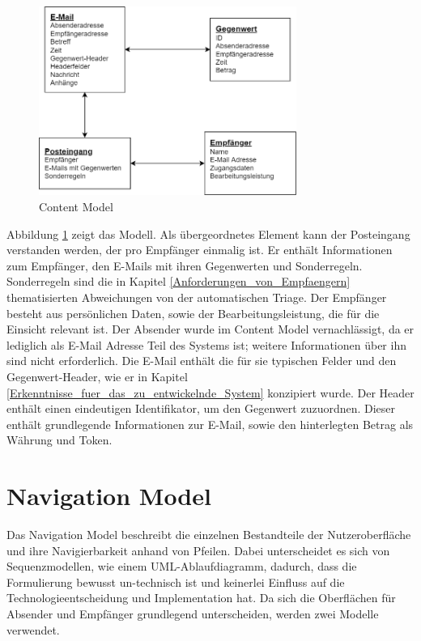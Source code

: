 \begin{figure}[!ht]
	\centering
		\includegraphics[width=0.75\textwidth]{Figures/Content Model.png}
	\caption{Content Model}
	\label{fig:content_model}
\end{figure}

\noindent Abbildung \ref{fig:content_model} zeigt das Modell. Als übergeordnetes Element kann der Posteingang verstanden werden, der pro Empfänger einmalig ist. Er enthält Informationen zum Empfänger, den E-Mails mit ihren Gegenwerten und Sonderregeln. Sonderregeln sind die in Kapitel \ref{Anforderungen_von_Empfaengern} thematisierten Abweichungen von der automatischen Triage. Der Empfänger besteht aus persönlichen Daten, sowie der Bearbeitungsleistung, die für die Einsicht relevant ist. Der Absender wurde im Content Model vernachlässigt, da er lediglich als E-Mail Adresse Teil des Systems ist; weitere Informationen über ihn sind nicht erforderlich. Die E-Mail enthält die für sie typischen Felder und den Gegenwert-Header, wie er in Kapitel \ref{Erkenntnisse_fuer_das_zu_entwickelnde_System} konzipiert wurde. Der Header enthält einen eindeutigen Identifikator, um den Gegenwert zuzuordnen. Dieser enthält grundlegende Informationen zur E-Mail, sowie den hinterlegten Betrag als Währung und Token.



\section{Navigation Model}
\label{Navigation_Model}

Das Navigation Model beschreibt die einzelnen Bestandteile der Nutzeroberfläche und ihre Navigierbarkeit anhand von Pfeilen. Dabei unterscheidet es sich von Sequenzmodellen, wie einem UML-Ablaufdiagramm, dadurch, dass die Formulierung bewusst un-technisch ist und keinerlei Einfluss auf die Technologieentscheidung und Implementation hat. Da sich die Oberflächen für Absender und Empfänger grundlegend unterscheiden, werden zwei Modelle verwendet.

